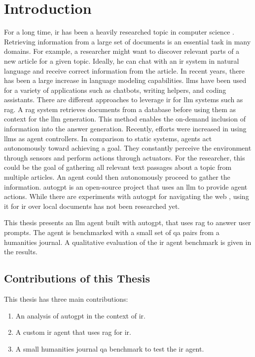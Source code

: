\documentclass[../main.tex]{subfiles}
\begin{document}
\chapter{Introduction}
\label{ch:introduction}

For a long time, \gls{ir} has been a heavily researched topic in computer science \cite{Singhal2001}.
Retrieving information from a large set of documents is an essential task in many domains.
For example,
a researcher might want to discover relevant parts of a new article for a given topic.
Ideally, he can chat with an \gls{ir} system in natural language
and receive correct information from the article.
In recent years, there has been a large increase in language modeling capabilities.
\Glspl{llm} have been used for a variety of applications such as chatbots,
writing helpers, and coding assistants.
There are different approaches to leverage \gls{ir} for \gls{llm} systems such as \gls{rag}.
A \Gls{rag} system retrieves documents from a database before using them as context
for the \gls{llm} generation.
This method enables the on-demand inclusion of information into the answer generation.
Recently, efforts were increased in using \glspl{llm} as agent controllers.
In comparison to static systems, agents act autonomously toward achieving a goal.
They constantly perceive the environment through sensors and perform actions
through actuators.
For the researcher,
this could be the goal of gathering all relevant text passages about a topic from
multiple articles.
An agent could then autonomously proceed to gather the information.
\Gls{autogpt} is an open-source project that uses an \gls{llm} to provide agent
actions.
While there are experiments with \gls{autogpt} for navigating the web \cite{Yang2023},
using it for \gls{ir} over local documents has not been researched yet.

This thesis presents an \gls{llm} agent built with \gls{autogpt},
that uses \gls{rag} to answer user prompts.
The agent is benchmarked with a small set of \gls{qa} pairs from a humanities journal.
A qualitative evaluation of the \gls{ir} agent benchmark is given in the results.

\section{Contributions of this Thesis}

This thesis has three main contributions:
\begin{enumerate}
    \item An analysis of \gls{autogpt} in the context of \gls{ir}.
    \item A custom \gls{ir} agent that uses \gls{rag} for \gls{ir}.
    \item A small humanities journal \gls{qa} benchmark to test the \gls{ir} agent.
\end{enumerate}
\end{document}
